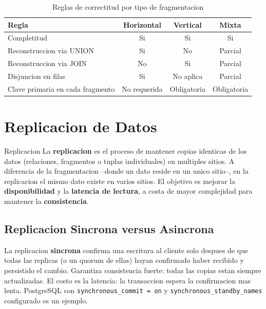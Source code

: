 \documentclass[11pt,a4paper]{article}
\begin{document}
\begin{table}[H]
\centering
\caption{Reglas de correctitud por tipo de fragmentacion}
\small
\begin{tabular}{lccc}
\toprule
\textbf{Regla} & \textbf{Horizontal} & \textbf{Vertical} & \textbf{Mixta} \\
\midrule
Completitud & Si & Si & Si \\
Reconstruccion via UNION & Si & No & Parcial \\
Reconstruccion via JOIN & No & Si & Parcial \\
Disjuncion en filas & Si & No aplica & Parcial \\
Clave primaria en cada fragmento & No requerida & Obligatoria & Obligatoria \\
\bottomrule
\end{tabular}
\label{tab:correctitud}
\end{table}

\section{Replicacion de Datos}

\begin{defbox}{Replicacion}
La \textbf{replicacion} es el proceso de mantener copias identicas de los datos (relaciones, fragmentos o tuplas individuales) en multiples sitios. A diferencia de la fragmentacion --donde un dato reside en un unico sitio--, en la replicacion el mismo dato existe en varios sitios. El objetivo es mejorar la \textbf{disponibilidad} y la \textbf{latencia de lectura}, a costa de mayor complejidad para mantener la \textbf{consistencia}.
\end{defbox}

\subsection{Replicacion Sincrona versus Asincrona}

La replicacion \textbf{sincrona} confirma una escritura al cliente solo despues de que todas las replicas (o un quorum de ellas) hayan confirmado haber recibido y persistido el cambio. Garantiza consistencia fuerte: todas las copias estan siempre actualizadas. El costo es la latencia: la transaccion espera la confirmacion mas lenta. PostgreSQL con \texttt{synchronous\_commit = on} y \texttt{synchronous\_standby\_names} configurado es un ejemplo.
\end{document}
